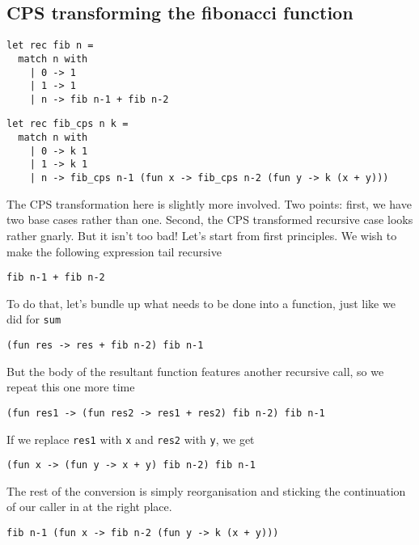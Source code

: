 \subsection{CPS transforming the fibonacci function}
\begin{code}
\label{code:fib-ocaml-again}
\begin{verbatim}
let rec fib n = 
  match n with
    | 0 -> 1
    | 1 -> 1
    | n -> fib n-1 + fib n-2
\end{verbatim}
\end{code}

\begin{code}
\label{code:fib-ocaml-again}
\begin{verbatim}
let rec fib_cps n k = 
  match n with
    | 0 -> k 1
    | 1 -> k 1
    | n -> fib_cps n-1 (fun x -> fib_cps n-2 (fun y -> k (x + y)))
\end{verbatim}
\end{code}

The CPS transformation here is slightly more involved. Two points: first, we have two base cases rather than one. Second, the CPS transformed recursive case looks rather gnarly. But it isn't too bad! Let's start from first principles. We wish to make the following expression tail recursive 

\begin{verbatim}
fib n-1 + fib n-2
\end{verbatim}
To do that, let's bundle up what needs to be done into a function, just like we did for \texttt{sum}
\begin{verbatim}
(fun res -> res + fib n-2) fib n-1 
\end{verbatim}
But the body of the resultant function features another recursive call, so we repeat this one more time
\begin{verbatim}
(fun res1 -> (fun res2 -> res1 + res2) fib n-2) fib n-1 
\end{verbatim}
If we replace \texttt{res1} with \texttt{x} and \texttt{res2} with \texttt{y}, we get
\begin{verbatim}
(fun x -> (fun y -> x + y) fib n-2) fib n-1 
\end{verbatim}
The rest of the conversion is simply reorganisation and sticking the continuation of our caller in at the right place.
\begin{verbatim}
fib n-1 (fun x -> fib n-2 (fun y -> k (x + y))) 
\end{verbatim}


